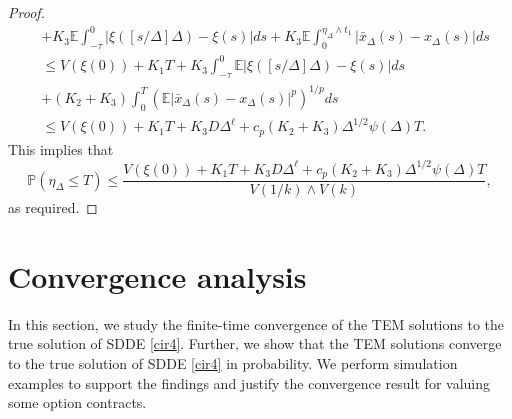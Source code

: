 \documentclass[11pt]{article}
\begin{document}
\begin{proof}
\begin{align*}
&+K_3\mathbb{E}\int_{-\tau}^{0}|\xi([s/\Delta]\Delta)-\xi(s)|ds+K_3\mathbb{E}\int_{0}^{\eta_{\Delta}\wedge t_1}\vert \bar{x}_{\Delta}(s)-x_{\Delta}(s)\vert ds\\
&\le  V(\xi(0))+K_1T+K_3\int_{-\tau}^0\mathbb{E}|\xi([s/\Delta]\Delta)-\xi(s)|ds\\
&+(K_2+K_3)\int_{0}^T(\mathbb{E}\vert \bar{x}_{\Delta}(s)-x_{\Delta}(s)\vert^p)^{1/p}ds\\
&\le V(\xi(0))+K_1T+K_3D\Delta^{\ell}+c_p(K_2+K_3)\Delta^{1/2}\psi(\Delta)T.
\end{align*}
This implies that 
\begin{equation*}
 \mathbb{P}(\eta_{\Delta}\leq T)\leq \frac{V(\xi(0))+K_1T+K_3D\Delta^{\ell}+c_p(K_2+K_3)\Delta^{1/2}\psi(\Delta)T}{V(1/k)\wedge V(k)},
\end{equation*}
as required.
\end{proof}
\section{Convergence analysis}\label{sect5}
In this section, we study the  finite-time convergence of the TEM solutions to the true solution of SDDE \eqref{cir4}. Further, we show that the TEM solutions converge  to the true solution of SDDE \eqref{cir4} in probability. We perform simulation examples to support the findings and justify the convergence result for valuing some option contracts.
\end{document}
